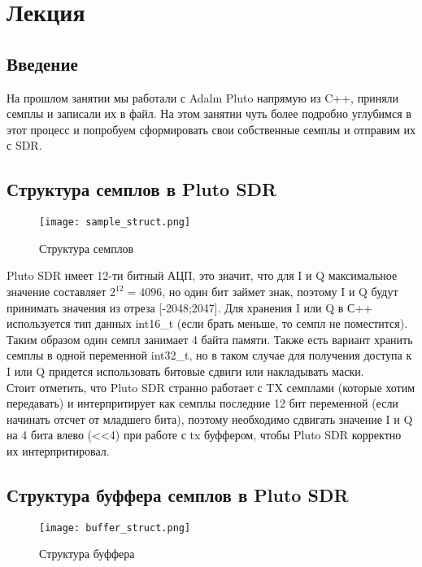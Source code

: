 \chapter{Лекция}
\label{ch:intro}

\section*{\textbf{Введение}}

На прошлом занятии мы работали с Adalm Pluto напрямую из C++, приняли семплы и записали их в файл. На этом занятии чуть более подробно углубимся в этот процесс и попробуем
сформировать свои собственные семплы и отправим их с SDR.

\section*{\textbf{Структура семплов в Pluto SDR}}

\begin{figure}[H]
    \centering
    \texttt{[image: sample\_struct.png]}
    \caption{Структура семплов}
\end{figure}

Pluto SDR имеет 12-ти битный АЦП, это значит, что для I и Q максимальное значение составляет $2^{12} = 4096$, но один бит займет знак, поэтому I и Q будут принимать значения
из отреза [-2048;2047]. Для хранения I или Q в С++ используется тип данных int16\_t (если брать меньше, то семпл не поместится). Таким образом один семпл занимает 4 байта
памяти. Также есть вариант хранить семплы в одной переменной int32\_t, но в таком случае для получения доступа к I или Q придется использовать битовые сдвиги или накладывать
маски. \\

Стоит отметить, что Pluto SDR странно работает с TX семплами (которые хотим передавать) и интерпритирует как семплы последние 12 бит переменной (если начинать отсчет от
младшего бита), поэтому необходимо сдвигать значение I и Q на 4 бита влево (<<4) при работе с tx буффером, чтобы Pluto SDR корректно их интерпритировал. 

\section*{\textbf{Структура буффера семплов в Pluto SDR}}

\begin{figure}[H]
    \centering
    \texttt{[image: buffer\_struct.png]}
    \caption{Структура буффера}
\end{figure}

